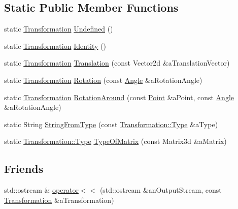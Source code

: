 \subsection*{Static Public Member Functions}
\begin{DoxyCompactItemize}
\item 
static \hyperlink{classlibrary_1_1math_1_1geom_1_1d2_1_1_transformation}{Transformation} \hyperlink{classlibrary_1_1math_1_1geom_1_1d2_1_1_transformation_a6d0773c77cff2399817231630c21526c}{Undefined} ()
\item 
static \hyperlink{classlibrary_1_1math_1_1geom_1_1d2_1_1_transformation}{Transformation} \hyperlink{classlibrary_1_1math_1_1geom_1_1d2_1_1_transformation_a49b82aa6caa2bf4626e37233c5e4b4df}{Identity} ()
\item 
static \hyperlink{classlibrary_1_1math_1_1geom_1_1d2_1_1_transformation}{Transformation} \hyperlink{classlibrary_1_1math_1_1geom_1_1d2_1_1_transformation_a1e4b212d847c33e459a466fcac022340}{Translation} (const Vector2d \&a\+Translation\+Vector)
\item 
static \hyperlink{classlibrary_1_1math_1_1geom_1_1d2_1_1_transformation}{Transformation} \hyperlink{classlibrary_1_1math_1_1geom_1_1d2_1_1_transformation_a579b2f9b2adae54cf4082aac81d5136a}{Rotation} (const \hyperlink{classlibrary_1_1math_1_1geom_1_1_angle}{Angle} \&a\+Rotation\+Angle)
\item 
static \hyperlink{classlibrary_1_1math_1_1geom_1_1d2_1_1_transformation}{Transformation} \hyperlink{classlibrary_1_1math_1_1geom_1_1d2_1_1_transformation_ab5ad2ddbeb32ba146b47b4b48b40ff1c}{Rotation\+Around} (const \hyperlink{classlibrary_1_1math_1_1geom_1_1d2_1_1objects_1_1_point}{Point} \&a\+Point, const \hyperlink{classlibrary_1_1math_1_1geom_1_1_angle}{Angle} \&a\+Rotation\+Angle)
\item 
static String \hyperlink{classlibrary_1_1math_1_1geom_1_1d2_1_1_transformation_a669dfc4a980aa3911215efb62ed1fa5b}{String\+From\+Type} (const \hyperlink{classlibrary_1_1math_1_1geom_1_1d2_1_1_transformation_af2a94a7be48a51e9cc40f3075040d348}{Transformation\+::\+Type} \&a\+Type)
\item 
static \hyperlink{classlibrary_1_1math_1_1geom_1_1d2_1_1_transformation_af2a94a7be48a51e9cc40f3075040d348}{Transformation\+::\+Type} \hyperlink{classlibrary_1_1math_1_1geom_1_1d2_1_1_transformation_a57acee01fdaf48464a09cb193622872c}{Type\+Of\+Matrix} (const Matrix3d \&a\+Matrix)
\end{DoxyCompactItemize}
\subsection*{Friends}
\begin{DoxyCompactItemize}
\item 
std\+::ostream \& \hyperlink{classlibrary_1_1math_1_1geom_1_1d2_1_1_transformation_afb2829e106dc4aeab1c706d1eaa357e8}{operator$<$$<$} (std\+::ostream \&an\+Output\+Stream, const \hyperlink{classlibrary_1_1math_1_1geom_1_1d2_1_1_transformation}{Transformation} \&a\+Transformation)
\end{DoxyCompactItemize}


